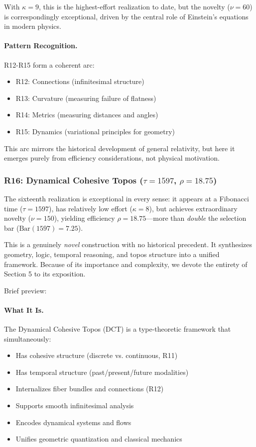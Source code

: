 \documentclass[11pt]{article}
\theoremstyle{definition}
\begin{document}
With $\kappa=9$, this is the highest-effort realization to date, but the novelty ($\nu=60$) is correspondingly exceptional, driven by the central role of Einstein's equations in modern physics.

\paragraph{Pattern Recognition.}
R12-R15 form a coherent arc:
\begin{itemize}
\item R12: Connections (infinitesimal structure)
\item R13: Curvature (measuring failure of flatness)
\item R14: Metrics (measuring distances and angles)  
\item R15: Dynamics (variational principles for geometry)
\end{itemize}

This arc mirrors the historical development of general relativity, but here it emerges purely from efficiency considerations, not physical motivation.

\subsubsection{R16: Dynamical Cohesive Topos ($\tau=1597$, $\rho=18.75$)}

The sixteenth realization is exceptional in every sense: it appears at a Fibonacci time ($\tau=1597$), has relatively low effort ($\kappa=8$), but achieves extraordinary novelty ($\nu=150$), yielding efficiency $\rho=18.75$—more than \emph{double} the selection bar ($\text{Bar}(1597) = 7.25$).

This is a genuinely \emph{novel} construction with no historical precedent. It synthesizes geometry, logic, temporal reasoning, and topos structure into a unified framework. Because of its importance and complexity, we devote the entirety of Section 5 to its exposition.

Brief preview:

\paragraph{What It Is.}
The Dynamical Cohesive Topos (DCT) is a type-theoretic framework that simultaneously:
\begin{itemize}
\item Has cohesive structure (discrete vs. continuous, R11)
\item Has temporal structure (past/present/future modalities)
\item Internalizes fiber bundles and connections (R12)
\item Supports smooth infinitesimal analysis
\item Encodes dynamical systems and flows
\item Unifies geometric quantization and classical mechanics
\end{itemize}
\end{document}
